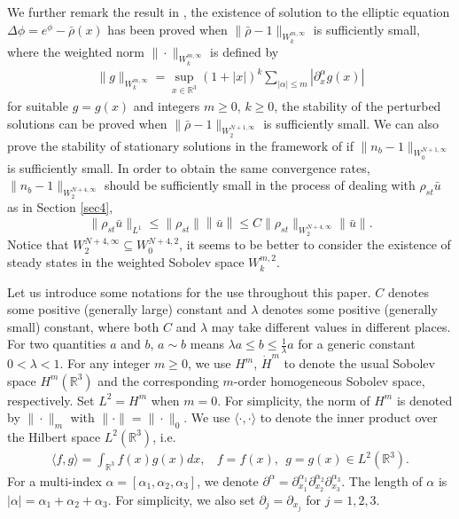 \documentclass[11pt]{amsart}
\numberwithin{equation}{section}
\begin{document}
We further remark the result in \cite{RY}, the existence of solution
to the elliptic equation $\Delta \phi=e^{\phi}-\bar{\rho}(x)$ has
been proved when $\|\bar{\rho}-1\|_{W_{k}^{m,\infty}}$ is
sufficiently small, where the weighted norm
$\|\cdot\|_{W_{k}^{m,\infty}}$ is defined by
\begin{eqnarray}\label{def.norm1}
\|g\|_{W_{k}^{m,\infty}}=\sup_{x\in\mathbb{R}^{3}}(1+|x|)^{k}\sum_{|\alpha|\leq
m}|\partial^{\alpha}_{x}g(x)|
\end{eqnarray}
for suitable $g=g(x)$ and integers $m\geq0$, $k\geq0$, the stability
of the perturbed solutions can be proved when
$\|\bar{\rho}-1\|_{W_{2}^{N+1,\infty}}$ is sufficiently small. We
can also prove the stability of stationary solutions in the
framework of \cite{RY} if $\|n_{b}-1\|_{W_{0}^{N+1,\infty}}$ is
sufficiently small. In order to obtain the same convergence rates,
$\|n_{b}-1\|_{W_{2}^{N+4,\infty}}$ should be sufficiently small in
the process of dealing with $\rho_{st}\bar{u}$ as in Section
\ref{sec4},
$$
\|\rho_{st} \bar{u}\|_{L^1} \leq \|\rho_{st}\|\left\|\bar{u}
\right\| \leq C \|\rho_{st}\|_{W_{2}^{N+4,\infty}}\| \bar{u}\|.
$$
Notice that $W_{2}^{N+4,\infty}\subseteq W_{0}^{N+4,2}$, it seems to
be better to consider the existence of steady states in the weighted
Sobolev space $W_{k}^{m,2}$.

 Let us introduce some notations for the use throughout this paper. $C$ denotes some
positive (generally large) constant and $ \lambda$ denotes some
positive (generally small) constant, where both $C$ and $ \lambda$
may take different values in different places. For two quantities
$a$ and $b$, $a\sim b$ means $\lambda a \leq  b \leq
\frac{1}{\lambda} a $ for a generic constant $0<\lambda<1$. For any
integer $m\geq 0$, we use $H^{m}$, $\dot{H}^{m}$ to denote the usual
Sobolev space $H^{m}(\mathbb{R}^{3})$ and the corresponding
$m$-order homogeneous Sobolev space, respectively. Set $L^{2}=H^{m}$
when $m = 0$. For simplicity, the norm of $ H^{m}$ is denoted by
$\|\cdot\|_{m} $ with $\|\cdot \|=\|\cdot\|_{0}$. We use $
\langle\cdot, \cdot \rangle$ to denote the inner product over the
Hilbert space $ L^{2}(\mathbb{R}^{3})$, i.e.
\begin{eqnarray*}
\langle f,g \rangle=\int_{\mathbb{R}^{3}} f(x)g(x)dx,\ \ \ \  f =
f(x),\ \  g = g(x)\in L^2(\mathbb{R}^{3}).
\end{eqnarray*}
 For a multi-index $\alpha =
[\alpha_1, \alpha_2, \alpha_3]$, we denote $\partial^{\alpha} =
\partial^{\alpha_{1}}_ {x_1}\partial^{\alpha_{2}}_ {x_2} \partial^{\alpha_{3}}_ {x_3} $.
The length of $ \alpha$ is $|\alpha| = \alpha_1 + \alpha_2 +
\alpha_3$. For simplicity, we also set
$\partial_{j}=\partial_{x_{j}}$ for $j = 1, 2, 3$.
\end{document}
